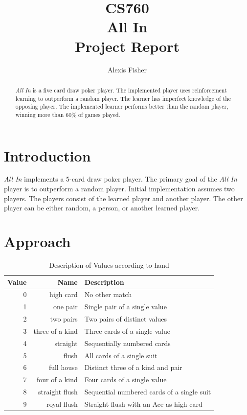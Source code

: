 \documentclass[12pt,pdftex]{article}
\title{CS760 \\ All In \\ Project Report }
\author{  Alexis Fisher }
\begin{document}
\ifpdf
{}
\else
{}
\fi
\maketitle
\begin{abstract}
\emph{All In} is a five card draw poker player.  
The implemented player uses reinforcement learning to outperform a random player. 
The learner has imperfect knowledge of the opposing player.
The implemented learner performs better than the random player, winning more than 60\% of games played.

\end{abstract}
\section{Introduction}
\emph{All In} implements a 5-card draw poker player. The primary goal of the \emph{All In} player is to outperform a random player. Initial implementation assumes two players. The players consist of the learned player and another player. The other player can be either random, a person, or another learned player. 

\section{Approach}
\begin{table}[ht]
\centering
	\begin{tabular}{| r | r | l |}
\hline
\textbf{Value} & \textbf{Name} & \textbf{Description} \\
\hline
0 & high card & No other match \\
1 & one pair & Single pair of a single value\\
2 & two pairs & Two pairs of distinct values\\
3 & three of a kind & Three cards of a single value\\
4 & straight & Sequentially numbered cards\\
5 & flush & All cards of a single suit\\
6 & full house & Distinct three of a kind and pair\\
7 & four of a kind & Four cards of a single value\\
8 & straight flush & Sequential numbered cards of a single suit\\
9 & royal flush & Straight flush with an Ace as high card\\
\hline
\end{tabular}
\caption{Description of Values according to hand}
\label{tab:cardvalues}
\end{table}
\end{document}
